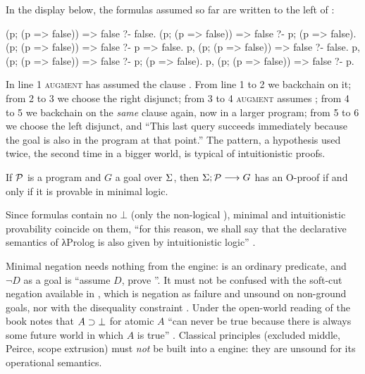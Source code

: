 {{\begin{tutorial}
In the display below, the formulas assumed so far are written to the left of :
\begin{lprolog}
(p; (p => false)) => false ?- false.
(p; (p => false)) => false ?- p; (p => false).
(p; (p => false)) => false ?- p => false.
p, (p; (p => false)) => false ?- false.
p, (p; (p => false)) => false ?- p; (p => false).
p, (p; (p => false)) => false ?- p.
\end{lprolog}
In line 1 \textsc{augment} has assumed the clause . From line 1 to 2 we
backchain on it; from 2 to 3 we choose the right disjunct; from 3 to 4 \textsc{augment} assumes ;
from 4 to 5 we backchain on the \emph{same} clause again, now in a larger program; from 5 to 6 we choose the
left disjunct, and ``This last query succeeds immediately because the goal  is also in the program at
that point.'' The pattern, a
hypothesis used twice, the second time in a bigger world, is typical of intuitionistic proofs.
\end{tutorial}

\begin{theorem}[\book{91}]\label{thm:hh-minimal}
If $\mathcal{P}$ is a \fohh{} program and $G$ a \fohh{} goal over $\Sigma$, then $\Sigma;\mathcal{P}\longrightarrow G$ has an
O-proof if and only if it is provable in minimal logic.
\end{theorem}

Since \fohh{} formulas contain no $\bot$ (only the non-logical ), minimal and intuitionistic
provability coincide on them, ``for this reason, we shall say that the declarative semantics of λProlog is
also given by intuitionistic logic'' .

\begin{kanren}[\texttt{=> false} is not negation as failure]
Minimal negation needs nothing from the engine:  is an ordinary predicate, and
$\neg D$ as a goal is ``assume $D$, prove ''. It must not be confused with the soft-cut negation
 available in \micro, which is negation as failure and unsound on non-ground goals, nor
with the disequality constraint . Under the open-world reading of \fohh{} the book notes that
$A\supset\bot$ for atomic $A$ ``can never be true because there is always some future world in which $A$ is
true'' . Classical principles (excluded middle, Peirce, scope extrusion) must \emph{not} be built
into a \fohh{} engine: they are unsound for its operational semantics.
\end{kanren}

}}
